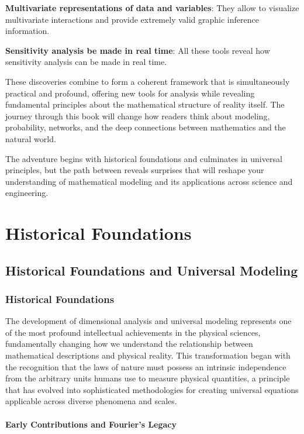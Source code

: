 \documentclass[
	11pt, %
	fleqn, %
	a4paper, %
]{LegrandOrangeBook}
\begin{document}
\textbf{Multivariate representations of data and variables}: They allow to visualize multivariate interactions and provide extremely valid graphic inference information.

\textbf{Sensitivity analysis be made in real time}: All these tools reveal how sensitivity analysis can be made in real time.

These discoveries combine to form a coherent framework that is simultaneously practical and profound, offering new tools for analysis while revealing fundamental principles about the mathematical structure of reality itself. The journey through this book will change how readers think about modeling, probability, networks, and the deep connections between mathematics and the natural world.

The adventure begins with historical foundations and culminates in universal principles, but the path between reveals surprises that will reshape your understanding of mathematical modeling and its applications across science and engineering.



\part{Historical Foundations}

\chapter{Historical Foundations and Universal Modeling}
\label{ch:historicalFoundations}
\section{Historical Foundations}

The development of dimensional analysis and universal modeling represents one of the most profound intellectual achievements in the physical sciences, fundamentally changing how we understand the relationship between mathematical descriptions and physical reality. This transformation began with the recognition that the laws of nature must possess an intrinsic independence from the arbitrary units humans use to measure physical quantities, a principle that has evolved into sophisticated methodologies for creating universal equations applicable across diverse phenomena and scales.

\subsection{Early Contributions and Fourier's Legacy}
\end{document}
